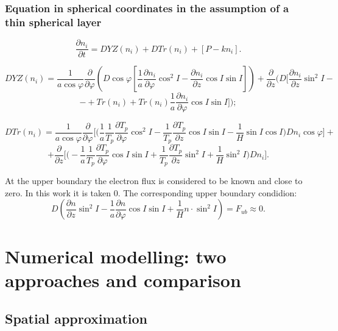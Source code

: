 \documentclass[9pt, apectratio=43,unicode]{beamer}
\begin{document}
\begin{frame}\frametitle{Equation in spherical coordinates in the assumption of a thin spherical layer}

$$\dfrac{\partial n_i}{\partial t} = DYZ(n_i)+DTr(n_i)+[P-kn_i].$$

$$DYZ(n_i) = \dfrac{1}{a\cos\varphi}\dfrac{\partial}{\partial\varphi}\left(D\cos\varphi\left[\dfrac{1}{a}\dfrac{\partial n_i}{\partial\varphi} \cos^2 I -\dfrac{\partial n_i}{\partial z}\cos I\sin I\right]\right)+ \dfrac{\partial}{\partial z}\bigg(D\bigg[\dfrac{\partial n_i}{\partial z}\sin^2 I -$$ $$- +Tr(n_i)+Tr(n_i)\dfrac{1}{a}\dfrac{\partial n_i}{\partial\varphi}\cos I \sin I\bigg]\bigg);$$ 

$$DTr(n_i) = \dfrac{1}{a\cos\varphi}\dfrac{\partial}{\partial \varphi}\bigg[\bigg(\dfrac{1}{a}\dfrac{1}{T_p}\dfrac{\partial T_p}{\partial\varphi}\cos^2 I-\dfrac{1}{T_p}\dfrac{\partial T_p}{\partial z}\cos I \sin I - \dfrac{1}{H}\sin I \cos I\bigg)Dn_i\cos\varphi\bigg] +$$ $$+ \dfrac{\partial}{\partial z}\bigg[\bigg(-\dfrac{1}{a}\dfrac{1}{T_p}\dfrac{\partial T_p}{\partial \varphi}\cos I \sin I +\dfrac{1}{T_p}\dfrac{\partial T_p}{\partial z}\sin^2 I+\dfrac{1}{H}\sin^2I\bigg)Dn_i\bigg].$$


At the upper boundary the electron flux is considered to be known and close to zero. In this work it is taken 0. The corresponding upper boundary condidion:
$$D\left(\dfrac{\partial n}{\partial z} \sin^2 I - \dfrac{1}{a}\dfrac{\partial n}{\partial \varphi} \cos I \sin I + \dfrac{1}{H} n \cdot \sin^2 I\right) = F_{ub} \approx 0.$$
\end{frame}


\section{Numerical modelling: two approaches and comparison}

\subsection{Spatial approximation}
\end{document}
